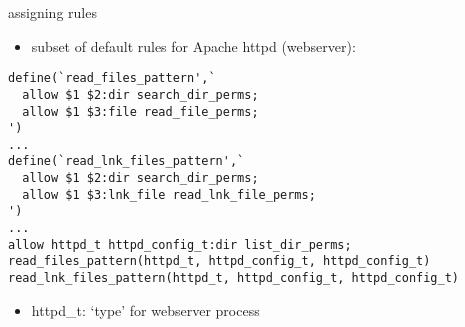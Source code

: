 \begin{frame}[fragile,label=selinuxRules1]{assigning rules}
\begin{itemize}
\item subset of default rules for Apache httpd (webserver):
\end{itemize}
\begin{Verbatim}[fontsize=\small]
define(`read_files_pattern',`
  allow $1 $2:dir search_dir_perms;
  allow $1 $3:file read_file_perms;
')
...
define(`read_lnk_files_pattern',`
  allow $1 $2:dir search_dir_perms;
  allow $1 $3:lnk_file read_lnk_file_perms;
')
...
allow httpd_t httpd_config_t:dir list_dir_perms;
read_files_pattern(httpd_t, httpd_config_t, httpd_config_t)
read_lnk_files_pattern(httpd_t, httpd_config_t, httpd_config_t)
\end{Verbatim}
\begin{itemize}
\item httpd\_t: `type' for webserver process
\end{itemize}
\end{frame}

